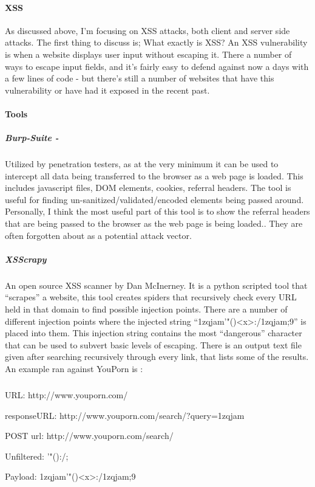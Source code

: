 \paragraph{XSS}
As discussed above, I’m focusing on XSS attacks, both client and server side attacks.  The first thing to discuss is; What exactly is XSS?  An XSS vulnerability is when a website displays user input without escaping it.  There a number of ways to escape input fields, and it’s fairly easy to defend against now a days with a few lines of code - but there’s still a number of websites that have this vulnerability or have had it exposed in the recent past.	


\paragraph{Tools}

\subparagraph{Burp-Suite -} 
Utilized by penetration testers, as at the very minimum it can be used to intercept all data being transferred to the browser as a web page is loaded.  This includes javascript files, DOM elements, cookies, referral headers.  The tool is useful for finding un-sanitized/validated/encoded elements being passed around.  
Personally, I think the most useful part of this tool is to show the referral headers that are being passed to the browser as the web page is being loaded.. They are often forgotten about as a potential attack vector. 

\subparagraph{XSScrapy}
An open source XSS scanner by Dan McInerney.  It is a python scripted tool that “scrapes” a website, this tool creates spiders that recursively check every URL held in that domain to find possible injection points.  There are a number of different injection points where the injected string “1zqjam'"(){}<x>:/1zqjam;9” is placed into them. This injection string contains the most “dangerous” character that can be used to subvert basic levels of escaping.
There is an output text file given after searching recursively through every link, that lists some of the results. An example ran against YouPorn is :

\subparagraph{}

URL: http://www.youporn.com/

responseURL: http://www.youporn.com/search/?query=1zqjam%

POST url: http://www.youporn.com/search/

Unfiltered: '"(){}:/;

Payload: 1zqjam'"(){}<x>:/1zqjam;9

